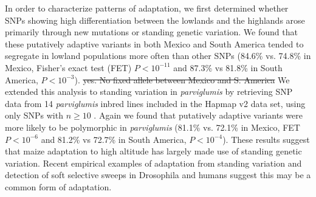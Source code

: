 In order to characterize patterns of adaptation, we first determined whether SNPs showing high differentiation between the lowlands and the highlands arose primarily through new mutations or standing genetic variation.  
We found that these putatively adaptive variants in both Mexico and South America tended to segregate in lowland populations more often than other SNPs (84.6\% vs. 74.8\% in Mexico, Fisher's exact test (FET) {$P < 10^{-11}$ and 87.3\% vs 81.8\% in South America,  $P< 10^{-3}$).  
\st{yes. No fixed allele between Mexico and S. America}
We extended this analysis to standing variation in \emph{parviglumis} by retrieving SNP data from 14 \emph{parviglumis} inbred lines included in the Hapmap v2 data set, using only SNPs with $n\geq10$ \cite[]{Chia_2012_22660545,Hufford_2012_22660546}.  
Again we found that putatively adaptive variants were more likely to be polymorphic in \emph{parviglumis} (81.1\% vs. 72.1\% in Mexico, FET {$P < 10^{-6}$ and 81.2\% vs 72.7\% in South America,  $P< 10^{-4}$).  
These results suggest that maize adaptation to high altitude has largely made use of standing genetic variation. 
Recent empirical examples of adaptation from standing variation \cite[Reviewed in ][]{Barrett_2008_18006185,Messer_2013_24075201} and detection of soft selective sweeps in Drosophila \cite[]{Garud_2013_ArXiv} and humans \cite[]{Turchin_2012_22902787,Peter_2012_23071458} suggest this may be a common form of adaptation.
}}

